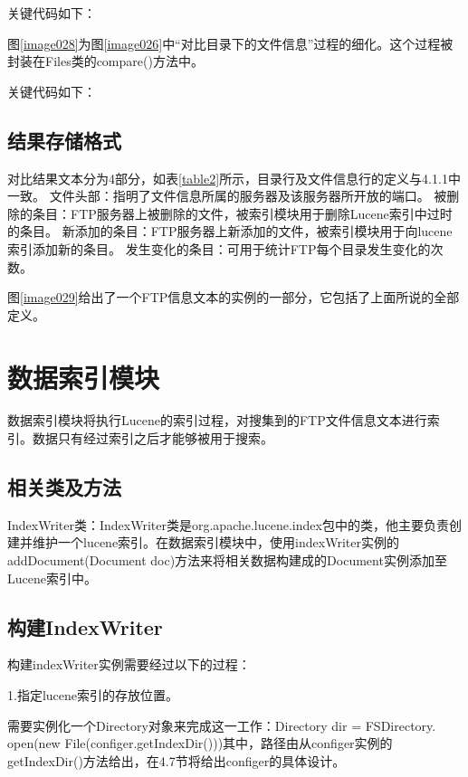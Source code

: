 关键代码如下：



图\ref{image028}为图\ref{image026}中“对比目录下的文件信息”过程的细化。这个过程被封装在Files类的compare()方法中。


关键代码如下：



\subsection{结果存储格式}
对比结果文本分为4部分，如表\ref{table2}所示，目录行及文件信息行的定义与4.1.1中一致。
文件头部：指明了文件信息所属的服务器及该服务器所开放的端口。
被删除的条目：FTP服务器上被删除的文件，被索引模块用于删除Lucene索引中过时的条目。
新添加的条目：FTP服务器上新添加的文件，被索引模块用于向lucene索引添加新的条目。
发生变化的条目：可用于统计FTP每个目录发生变化的次数。
\newpage
{}

图\ref{image029}给出了一个FTP信息文本的实例的一部分，它包括了上面所说的全部定义。


\section{数据索引模块}
数据索引模块将执行Lucene的索引过程，对搜集到的FTP文件信息文本进行索引。数据只有经过索引之后才能够被用于搜索。
\subsection{相关类及方法}
IndexWriter类：IndexWriter类是org.apache.lucene.index包中的类，他主要负责创建并维护一个lucene索引。在数据索引模块中，使用indexWriter实例的\\add\-Docu\-ment\-(Document doc)方法来将相关数据构建成的Document实例添加至Lucene索引中。
\subsection{构建IndexWriter}
构建indexWriter实例需要经过以下的过程：

1.指定lucene索引的存放位置。

需要实例化一个Directory对象来完成这一工作：Directory dir = FSDirectory.\\open(new File(configer.getIndexDir()))其中，路径由从configer实例的getIndexDir()方法给出，在4.7节将给出configer的具体设计。

